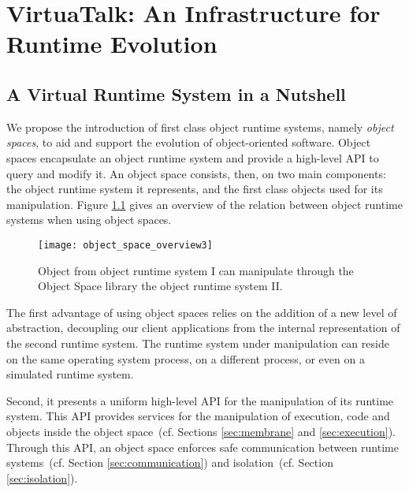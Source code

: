 

\chapter{VirtuaTalk: An Infrastructure for Runtime Evolution}
\minitoc
\introduction

\section{A Virtual Runtime System in a Nutshell}

We propose the introduction of first class object runtime systems, namely \emph{object spaces}, to aid and support the evolution of object-oriented software.
Object spaces encapsulate an object runtime system and provide a high-level API to query and modify it. An object space consists, then, on two main components: the object runtime system it represents, and the first class objects used for its manipulation. Figure \ref{fig:objectSpaceOverview} gives an overview of the relation between object runtime systems when using object spaces.

\begin{figure}[htb]
\begin{center}
\texttt{[image: object\_space\_overview3]}
\caption{Object from object runtime system I can manipulate through the Object Space library the object runtime system II.\label{fig:objectSpaceOverview}}
\end{center}
\end{figure}

The first advantage of using object spaces relies on the addition of a new level of abstraction, decoupling our client applications from the internal representation of the second runtime system. The runtime system under manipulation can reside \eg on the same operating system process, on a different process, or even on a simulated runtime system.

Second, it presents a uniform high-level API for the manipulation of its runtime system. This API provides services for the manipulation of execution, code and objects inside the object space~(cf. Sections \ref{sec:membrane} and \ref{sec:execution}). Through this API, an object space enforces safe communication between runtime systems~(cf. Section \ref{sec:communication}) and isolation~(cf. Section \ref{sec:isolation}).

